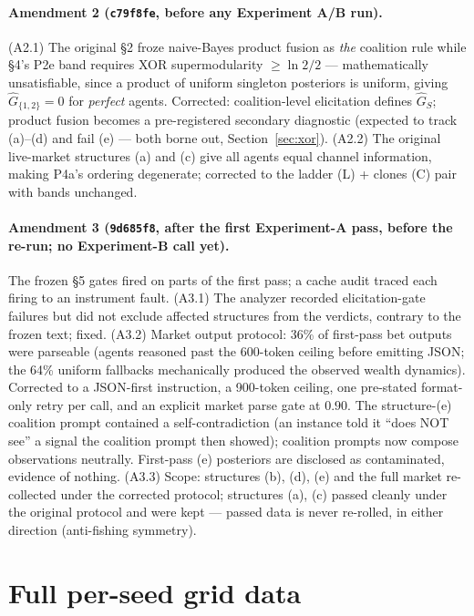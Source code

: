 \documentclass{article} %
\newcommand{\Ghat}{\hat{G}}
\begin{document}
\paragraph{Amendment 2 (\texttt{c79f8fe}, before any Experiment A/B run).} (A2.1) The original \S2 froze naive-Bayes product fusion as \emph{the} coalition rule while \S4's P2e band requires XOR supermodularity $\geq \ln2/2$ --- mathematically unsatisfiable, since a product of uniform singleton posteriors is uniform, giving $\Ghat_{\{1,2\}} = 0$ for \emph{perfect} agents. Corrected: coalition-level elicitation defines $\Ghat_S$; product fusion becomes a pre-registered secondary diagnostic (expected to track (a)--(d) and fail (e) --- both borne out, Section~\ref{sec:xor}). (A2.2) The original live-market structures (a) and (c) give all agents equal channel information, making P4a's ordering degenerate; corrected to the ladder (L) + clones (C) pair with bands unchanged.

\paragraph{Amendment 3 (\texttt{9d685f8}, after the first Experiment-A pass, before the re-run; no Experiment-B call yet).} The frozen \S5 gates fired on parts of the first pass; a cache audit traced each firing to an instrument fault. (A3.1) The analyzer recorded elicitation-gate failures but did not exclude affected structures from the verdicts, contrary to the frozen text; fixed. (A3.2) Market output protocol: 36\% of first-pass bet outputs were parseable (agents reasoned past the 600-token ceiling before emitting JSON; the 64\% uniform fallbacks mechanically produced the observed wealth dynamics). Corrected to a JSON-first instruction, a 900-token ceiling, one pre-stated format-only retry per call, and an explicit market parse gate at $0.90$. The structure-(e) coalition prompt contained a self-contradiction (an instance told it ``does NOT see'' a signal the coalition prompt then showed); coalition prompts now compose observations neutrally. First-pass (e) posteriors are disclosed as contaminated, evidence of nothing. (A3.3) Scope: structures (b), (d), (e) and the full market re-collected under the corrected protocol; structures (a), (c) passed cleanly under the original protocol and were kept --- passed data is never re-rolled, in either direction (anti-fishing symmetry).

\section{Full per-seed grid data}
\label{app:grid}
\end{document}
